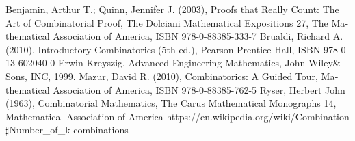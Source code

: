 \documentclass[12pt]{article}
\begin{document}
\begin{thebibliography}{10}
\begin{latin}
\bibitem{}
Benjamin, Arthur T.; Quinn, Jennifer J. (2003), Proofs that Really Count: The Art of Combinatorial Proof, The Dolciani Mathematical Expositions 27, The Mathematical Association of America, ISBN 978-0-88385-333-7
\bibitem{}
Brualdi, Richard A. (2010), Introductory Combinatorics (5th ed.), Pearson Prentice Hall, ISBN 978-0-13-602040-0
\bibitem{}
Erwin Kreyszig, Advanced Engineering Mathematics, John Wiley\& Sons, INC, 1999.
\bibitem{}
Mazur, David R. (2010), Combinatorics: A Guided Tour, Mathematical Association of America, ISBN 978-0-88385-762-5
\bibitem{}
Ryser, Herbert John (1963), Combinatorial Mathematics, The Carus Mathematical Monographs 14, Mathematical Association of America
\bibitem{}
https://en.wikipedia.org/wiki/Combination$\sharp$Number\_of\_k-combinations
\end{latin}
\end{thebibliography}
\end{document}
